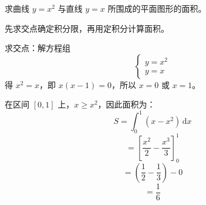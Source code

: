 \documentclass[answer]{THUExam}
\begin{document}
\begin{problem}
求曲线 $y=x^2$ 与直线 $y=x$ 所围成的平面图形的面积。
\end{problem}
\begin{note}
先求交点确定积分限，再用定积分计算面积。
\end{note}
\begin{solution}
求交点：解方程组
$$\begin{cases} y = x^2 \\ y = x \end{cases}$$
得 $x^2=x$，即 $x(x-1)=0$，所以 $x=0$ 或 $x=1$。

在区间 $[0,1]$ 上，$x \geq x^2$，因此面积为：
$$S = \int_0^1 (x-x^2)\,\mathrm{d}x$$
$$= \left[\frac{x^2}{2}-\frac{x^3}{3}\right]_0^1$$
$$= \left(\frac{1}{2}-\frac{1}{3}\right) - 0$$
$$= \frac{1}{6}$$
\end{solution}
\end{document}
